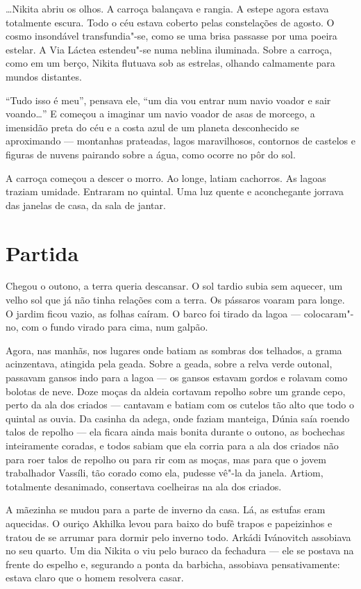 \ldots{}Nikita abriu os olhos. A carroça balançava e rangia. A estepe agora
estava totalmente escura. Todo o céu estava coberto pelas constelações
de agosto. O cosmo insondável transfundia"-se, como se uma brisa passasse
por uma poeira estelar. A Via Láctea estendeu"-se numa neblina iluminada.
Sobre a carroça, como em um berço, Nikita flutuava sob as estrelas,
olhando calmamente para mundos distantes.

``Tudo isso é meu'', pensava ele, ``um dia vou entrar num navio voador e
sair voando\ldots{}'' E começou a imaginar um navio voador de asas de
morcego, a imensidão preta do céu e a costa azul de um planeta
desconhecido se aproximando --- montanhas prateadas, lagos maravilhosos,
contornos de castelos e figuras de nuvens pairando sobre a água, como
ocorre no pôr do sol.

A carroça começou a descer o morro. Ao longe, latiam cachorros. As
lagoas traziam umidade. Entraram no quintal. Uma luz quente e
aconchegante jorrava das janelas de casa, da sala de jantar.

\chapter{Partida}

Chegou o outono, a terra queria descansar. O sol tardio subia sem
aquecer, um velho sol que já não tinha relações com a terra. Os pássaros
voaram para longe. O jardim ficou vazio, as folhas caíram. O barco foi
tirado da lagoa --- colocaram"-no, com o fundo virado para cima, num
galpão.

Agora, nas manhãs, nos lugares onde batiam as sombras dos telhados, a
grama acinzentava, atingida pela geada. Sobre a geada, sobre a relva
verde outonal, passavam gansos indo para a lagoa --- os gansos estavam
gordos e rolavam como bolotas de neve. Doze moças da aldeia cortavam
repolho sobre um grande cepo, perto da ala dos criados --- cantavam e
batiam com os cutelos tão alto que todo o quintal as ouvia. Da casinha
da adega, onde faziam manteiga, Dúnia saía roendo talos de repolho ---
ela ficara ainda mais bonita durante o outono, as bochechas inteiramente
coradas, e todos sabiam que ela corria para a ala dos criados não para
roer talos de repolho ou para rir com as moças, mas para que o jovem
trabalhador Vassíli, tão corado como ela, pudesse vê"-la da janela.
Artiom, totalmente desanimado, consertava coelheiras na ala dos criados.

A mãezinha se mudou para a parte de inverno da casa. Lá, as estufas
eram aquecidas. O ouriço Akhilka levou para baixo do bufê trapos e
papeizinhos e tratou de se arrumar para dormir pelo inverno todo. Arkádi
Ivánovitch assobiava no seu quarto. Um dia Nikita o viu pelo buraco da
fechadura --- ele se postava na frente do espelho e, segurando a ponta da
barbicha, assobiava pensativamente: estava claro que o homem resolvera
casar.

